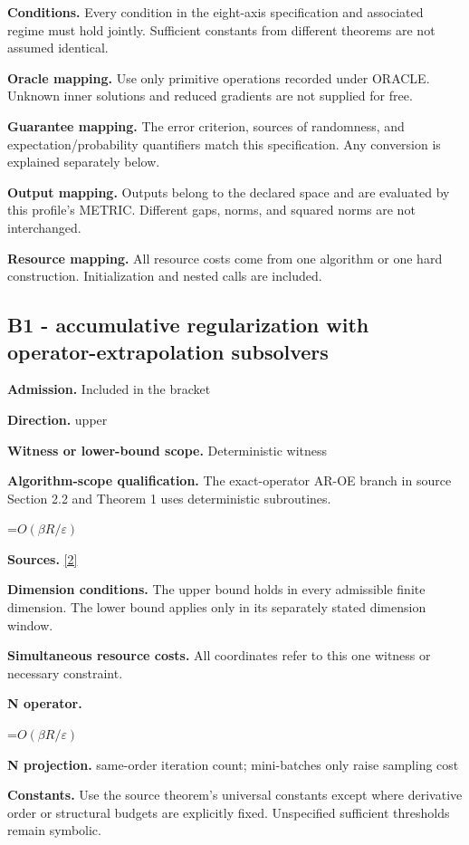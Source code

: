 \documentclass[10pt,a4paper]{article}
\newcommand{\AtlasMath}[1]{\par\begingroup\centering\setbox0=\hbox{$\displaystyle #1$}\ifdim\wd0>1.4\linewidth\typeout{ATLAS WIDE FORMULA: \the\wd0}\fi\ifdim\wd0>\linewidth\resizebox{\linewidth}{!}{\box0}\else\box0\fi\par\endgroup}
\begin{document}
\textbf{Conditions.} Every condition in the eight-axis specification and associated regime must hold jointly. Sufficient constants from different theorems are not assumed identical.

\textbf{Oracle mapping.} Use only primitive operations recorded under ORACLE. Unknown inner solutions and reduced gradients are not supplied for free.

\textbf{Guarantee mapping.} The error criterion, sources of randomness, and expectation/probability quantifiers match this specification. Any conversion is explained separately below.

\textbf{Output mapping.} Outputs belong to the declared space and are evaluated by this profile's METRIC. Different gaps, norms, and squared norms are not interchanged.

\textbf{Resource mapping.} All resource costs come from one algorithm or one hard construction. Initialization and nested calls are included.

\subsection{B1 - accumulative regularization with operator-extrapolation subsolvers}
\textbf{Admission.} Included in the bracket

\textbf{Direction.} upper

\textbf{Witness or lower-bound scope.} Deterministic witness

\textbf{Algorithm-scope qualification.} The exact-operator AR-OE branch in source Section 2.2 and Theorem 1 uses deterministic subroutines.

\AtlasMath{O(\beta R/\varepsilon)}
\textbf{Sources.} \href{https://arxiv.org/pdf/2609.04188v2}{[2]}

\textbf{Dimension conditions.} The upper bound holds in every admissible finite dimension. The lower bound applies only in its separately stated dimension window.

\textbf{Simultaneous resource costs.} All coordinates refer to this one witness or necessary constraint.

\textbf{N operator.}

\AtlasMath{O(\beta R/\varepsilon)}
\textbf{N projection.} same-order iteration count; mini-batches only raise sampling cost

\textbf{Constants.} Use the source theorem’s universal constants except where derivative order or structural budgets are explicitly fixed. Unspecified sufficient thresholds remain symbolic.
\end{document}
